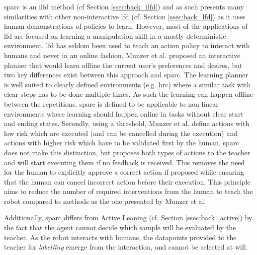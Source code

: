 \gls{sparc} is an \gls{ilfd} method (cf Section \ref{ssec:back_ilfd}) and as such presents many similarities with other non-interactive \gls{lfd} (cf. Section \ref{ssec:back_lfd}) as it uses human demonstrations of policies to learn. However, most of the applications of \gls{lfd} \citep{argall2009survey,billard2008robot} are focused on learning a manipulation skill in a mostly deterministic environment. \gls{lfd} has seldom been used to teach an action policy to interact with humans \citep{liu2014train,sequeira2016discovering,munzer2017efficient} and never in an online fashion. Munzer et al. proposed an interactive planner that would learn offline the current user's preferences and desires, but two key differences exist between this approach and \gls{sparc}. The learning planner is well suited to clearly defined environments (e.g. \gls{hrc}) where a similar task with clear steps has to be done multiple times. As such the learning can happen offline between the repetitions. \gls{sparc} is defined to be applicable to non-linear environments where learning should happen online in tasks without clear start and ending states. Secondly, using a threshold, Munzer et al. define actions with low risk which are executed (and can be cancelled during the execution) and actions with higher risk which have to be validated first by the human. \gls{sparc} does not make this distinction, but proposes both types of actions to the teacher and will start executing them if no feedback is received. This removes the  need for the human to explicitly approve a correct action if proposed while ensuring that the human can cancel incorrect action before their execution. This principle aims to reduce the number of required interventions from the human to teach the robot compared to methods as the one presented by Munzer et al. 

Additionally, \gls{sparc} differs from Active Leaning (cf. Section \ref{ssec:back_active}) by the fact that the agent cannot decide which sample will be evaluated by the teacher. As the robot interacts with humans, the datapoints provided to the teacher for \textit{labelling} emerge from the interaction, and cannot be selected at will. 
    

